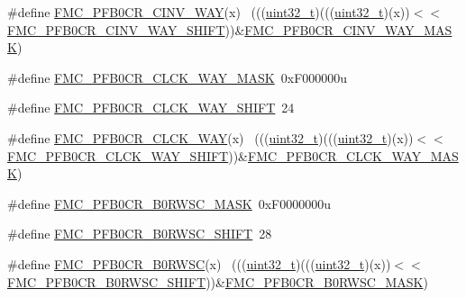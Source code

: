 \begin{DoxyCompactItemize}
\item 
\#define \hyperlink{group___f_m_c___register___masks_gad0d08df586dbedc2204ee34d32bb5f34}{F\+M\+C\+\_\+\+P\+F\+B0\+C\+R\+\_\+\+C\+I\+N\+V\+\_\+\+W\+AY}(x)                                  ~(((\hyperlink{_p_e___types_8h_a33594304e786b158f3fb30289278f5af}{uint32\+\_\+t})(((\hyperlink{_p_e___types_8h_a33594304e786b158f3fb30289278f5af}{uint32\+\_\+t})(x))$<$$<$\hyperlink{group___f_m_c___register___masks_ga987dfe8d13ee805246f048943fcb9ee5}{F\+M\+C\+\_\+\+P\+F\+B0\+C\+R\+\_\+\+C\+I\+N\+V\+\_\+\+W\+A\+Y\+\_\+\+S\+H\+I\+FT}))\&\hyperlink{group___f_m_c___register___masks_gad64b080bc4174e9af7d04246befca017}{F\+M\+C\+\_\+\+P\+F\+B0\+C\+R\+\_\+\+C\+I\+N\+V\+\_\+\+W\+A\+Y\+\_\+\+M\+A\+SK})
\item 
\#define \hyperlink{group___f_m_c___register___masks_ga84cd7c7d92e93b07f7c0f8d7cf003b98}{F\+M\+C\+\_\+\+P\+F\+B0\+C\+R\+\_\+\+C\+L\+C\+K\+\_\+\+W\+A\+Y\+\_\+\+M\+A\+SK}~0x\+F000000u
\item 
\#define \hyperlink{group___f_m_c___register___masks_ga3629d923b58bcbe6202254d72c69fab9}{F\+M\+C\+\_\+\+P\+F\+B0\+C\+R\+\_\+\+C\+L\+C\+K\+\_\+\+W\+A\+Y\+\_\+\+S\+H\+I\+FT}~24
\item 
\#define \hyperlink{group___f_m_c___register___masks_gaa5779276807bbdfb825a532c85ba55d3}{F\+M\+C\+\_\+\+P\+F\+B0\+C\+R\+\_\+\+C\+L\+C\+K\+\_\+\+W\+AY}(x)                                  ~(((\hyperlink{_p_e___types_8h_a33594304e786b158f3fb30289278f5af}{uint32\+\_\+t})(((\hyperlink{_p_e___types_8h_a33594304e786b158f3fb30289278f5af}{uint32\+\_\+t})(x))$<$$<$\hyperlink{group___f_m_c___register___masks_ga3629d923b58bcbe6202254d72c69fab9}{F\+M\+C\+\_\+\+P\+F\+B0\+C\+R\+\_\+\+C\+L\+C\+K\+\_\+\+W\+A\+Y\+\_\+\+S\+H\+I\+FT}))\&\hyperlink{group___f_m_c___register___masks_ga84cd7c7d92e93b07f7c0f8d7cf003b98}{F\+M\+C\+\_\+\+P\+F\+B0\+C\+R\+\_\+\+C\+L\+C\+K\+\_\+\+W\+A\+Y\+\_\+\+M\+A\+SK})
\item 
\#define \hyperlink{group___f_m_c___register___masks_ga6231856131c9747d8bf0b2bebcf4f172}{F\+M\+C\+\_\+\+P\+F\+B0\+C\+R\+\_\+\+B0\+R\+W\+S\+C\+\_\+\+M\+A\+SK}~0x\+F0000000u
\item 
\#define \hyperlink{group___f_m_c___register___masks_gafc34ff86025a1657d05d3f6a2de1ec7f}{F\+M\+C\+\_\+\+P\+F\+B0\+C\+R\+\_\+\+B0\+R\+W\+S\+C\+\_\+\+S\+H\+I\+FT}~28
\item 
\#define \hyperlink{group___f_m_c___register___masks_ga4ddd6d13f0feab2f52a6ab8e3417d738}{F\+M\+C\+\_\+\+P\+F\+B0\+C\+R\+\_\+\+B0\+R\+W\+SC}(x)                                      ~(((\hyperlink{_p_e___types_8h_a33594304e786b158f3fb30289278f5af}{uint32\+\_\+t})(((\hyperlink{_p_e___types_8h_a33594304e786b158f3fb30289278f5af}{uint32\+\_\+t})(x))$<$$<$\hyperlink{group___f_m_c___register___masks_gafc34ff86025a1657d05d3f6a2de1ec7f}{F\+M\+C\+\_\+\+P\+F\+B0\+C\+R\+\_\+\+B0\+R\+W\+S\+C\+\_\+\+S\+H\+I\+FT}))\&\hyperlink{group___f_m_c___register___masks_ga6231856131c9747d8bf0b2bebcf4f172}{F\+M\+C\+\_\+\+P\+F\+B0\+C\+R\+\_\+\+B0\+R\+W\+S\+C\+\_\+\+M\+A\+SK})
$$
\end{DoxyCompactItemize}
